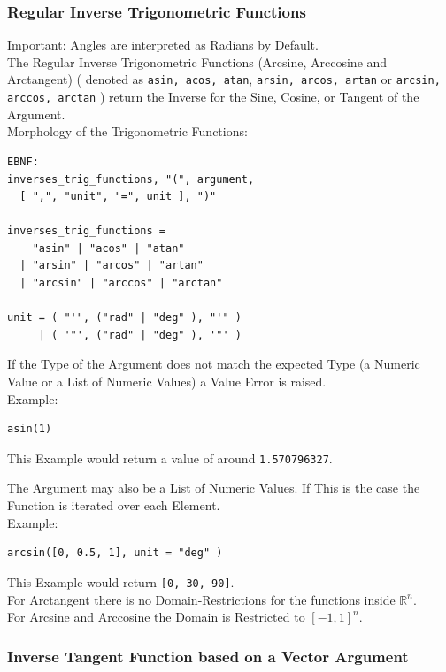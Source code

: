 \documentclass{report}
\begin{document}
\subsubsection{Regular Inverse Trigonometric Functions}
Important: Angles are interpreted as Radians by Default.\\
The Regular Inverse Trigonometric Functions (Arcsine, Arccosine and Arctangent) ( denoted as \texttt{asin, acos, atan}, \texttt{arsin, arcos, artan} or \texttt{arcsin, arccos, arctan} ) return the Inverse for the Sine, Cosine, or Tangent of the Argument. \\
Morphology of the Trigonometric Functions:
\begin{verbatim}
EBNF:
inverses_trig_functions, "(", argument, 
  [ ",", "unit", "=", unit ], ")"

inverses_trig_functions = 
    "asin" | "acos" | "atan" 
  | "arsin" | "arcos" | "artan"
  | "arcsin" | "arccos" | "arctan"

unit = ( "'", ("rad" | "deg" ), "'" )
     | ( '"', ("rad" | "deg" ), '"' )
\end{verbatim}
If the Type of the Argument does not match the expected Type (a Numeric Value or a List of Numeric Values) a Value Error is raised.\\
Example:
\begin{verbatim}
asin(1)
\end{verbatim}
This Example would return a value of around \texttt{1.570796327}.

The Argument may also be a List of Numeric Values. If This is the case the Function is iterated over each Element.\\
Example:
\begin{verbatim}
arcsin([0, 0.5, 1], unit = "deg" )
\end{verbatim}
This Example would return \texttt{[0, 30, 90]}.\\
For Arctangent there is no Domain-Restrictions for the functions inside $\mathbb{R}^n$. \\
For Arcsine and Arccosine the Domain is Restricted to $[-1,1]^n$.\\

\subsubsection{Inverse Tangent Function based on a Vector Argument}

\newpage
\end{document}
